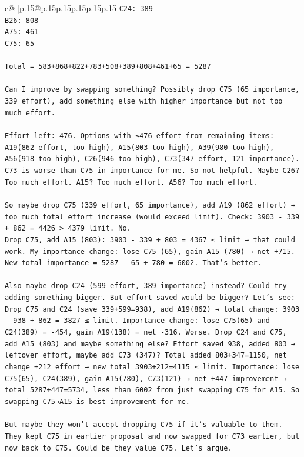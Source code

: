 \documentclass{article}
\begin{document}
{\begin{supertabular}{c@{$\;$}|p{.15\linewidth}@{}p{.15\linewidth}p{.15\linewidth}p{.15\linewidth}p{.15\linewidth}p{.15\linewidth}}
{{{\texttt{C24: 389  } \\
\texttt{B26: 808  } \\
\texttt{A75: 461  } \\
\texttt{C75: 65  } \\
\\ 
\texttt{Total = 583+868+822+783+508+389+808+461+65 = 5287  } \\
\\ 
\texttt{Can I improve by swapping something? Possibly drop C75 (65 importance, 339 effort), add something else with higher importance but not too much effort.  } \\
\\ 
\texttt{Effort left: 476. Options with ≤476 effort from remaining items: A19(862 effort, too high), A15(803 too high), A39(980 too high), A56(918 too high), C26(946 too high), C73(347 effort, 121 importance). C73 is worse than C75 in importance for me. So not helpful. Maybe C26? Too much effort. A15? Too much effort. A56? Too much effort.  } \\
\\ 
\texttt{So maybe drop C75 (339 effort, 65 importance), add A19 (862 effort) → too much total effort increase (would exceed limit). Check: 3903 {-} 339 + 862 = 4426 > 4379 limit. No.  } \\
\texttt{Drop C75, add A15 (803): 3903 {-} 339 + 803 = 4367 ≤ limit → that could work. My importance change: lose C75 (65), gain A15 (780) → net +715. New total importance = 5287 {-} 65 + 780 = 6002. That’s better.  } \\
\\ 
\texttt{Also maybe drop C24 (599 effort, 389 importance) instead? Could try adding something bigger. But effort saved would be bigger? Let’s see: Drop C75 and C24 (save 339+599=938), add A19(862) → total change: 3903 {-} 938 + 862 = 3827 ≤ limit. Importance change: lose C75(65) and C24(389) = {-}454, gain A19(138) = net {-}316. Worse. Drop C24 and C75, add A15 (803) and maybe something else? Effort saved 938, added 803 → leftover effort, maybe add C73 (347)? Total added 803+347=1150, net change +212 effort → new total 3903+212=4115 ≤ limit. Importance: lose C75(65), C24(389), gain A15(780), C73(121) → net +447 improvement → total 5287+447=5734, less than 6002 from just swapping C75 for A15. So swapping C75→A15 is best improvement for me.  } \\
\\ 
\texttt{But maybe they won’t accept dropping C75 if it’s valuable to them. They kept C75 in earlier proposal and now swapped for C73 earlier, but now back to C75. Could be they value C75. Let’s argue.  } \\
}}}
\end{supertabular}}
\end{document}
